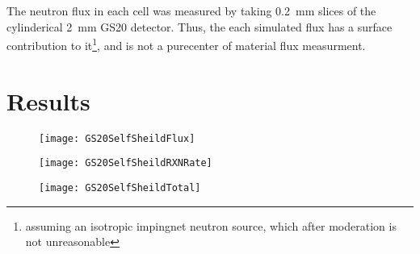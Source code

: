 \documentclass[draftcls,onecolumn]{IEEEtran}
\begin{document}
The neutron flux in each cell was measured by taking \SI{0.2}{\mm} slices of the cylinderical \SI{2}{\mm} GS20 detector.
Thus, the each simulated flux has a surface contribution to it\footnote{assuming an isotropic impingnet neutron source, which after moderation is not unreasonable}, and is not a purecenter of material flux measurment.

\section{Results}
\begin{figure}
	\texttt{[image: GS20SelfSheildFlux]}
	\caption[Flux Profile through GS20]{}
\end{figure}
\begin{figure}
	\texttt{[image: GS20SelfSheildRXNRate]}
	\caption[Reaction Rate through GS20]{}
	\label{fig:RxnRate}
\end{figure}
\begin{figure}
	\texttt{[image: GS20SelfSheildTotal]}
	\caption[Total Reaction Rate]{}
	\label{fig:TotalRxn}
\end{figure}
\end{document}
